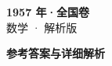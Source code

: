 \documentclass[zihao=-4, a4paper]{ctexart}
\begin{document}
\begin{center}
  {\Large\bfseries 1957 年·全国卷}\\[4pt]
  {\large 数学 · 解析版}
\end{center}
\medskip
{}

\clearpage
{}
\begin{center}{\Large\bfseries 参考答案与详细解析}\end{center}
\medskip

\end{document}
